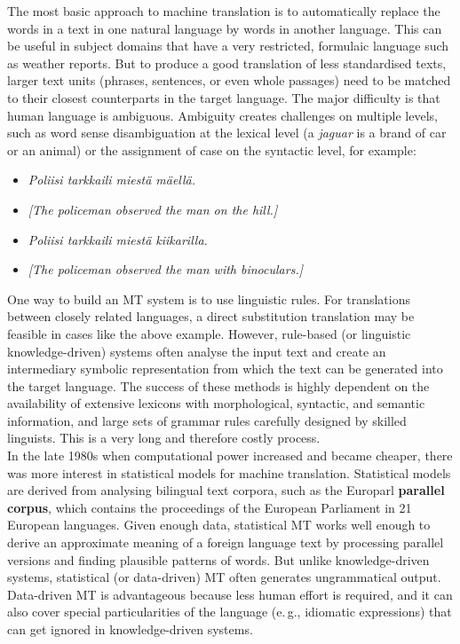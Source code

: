 \begin{multicols}{2}
The most basic approach to machine translation is to automatically replace the
words in a text in one natural language by words in another language. This can
be useful in subject domains that have a very restricted, formulaic language
such as weather reports. But to produce a good translation of less standardised
texts, larger text units (phrases, sentences, or even whole passages) need to
be matched to their closest counterparts in the target language. The major
difficulty is that human language is ambiguous. Ambiguity creates challenges on
multiple levels, such as word sense disambiguation at the lexical level (a
\textit{jaguar} is a brand of car or an animal) or the assignment of case on the
syntactic level, for example:
\begin{itemize}
\item[] {\foreignlanguage{finnish}
         {\textit{Poliisi tarkkaili miestä mäellä.}}} 
\item        \textit{[The policeman observed the man on the hill.]}

\item[] {\foreignlanguage{finnish}{\textit{Poliisi tarkkaili miestä
                kiikarilla.}}} 
\item        \textit{[The policeman observed the man with binoculars.]}
\end{itemize}
One way to build an MT system is to use linguistic rules. For translations
between closely related languages, a direct substitution translation may be
feasible in cases like the above example. However, rule-based (or linguistic
knowledge-driven) systems often analyse the input text and create an
intermediary symbolic representation from which the text can be generated into
the target language. The success of these methods is highly dependent on the
availability of extensive lexicons with morphological, syntactic, and semantic
information, and large sets of grammar rules carefully designed by skilled
linguists. This is a very long and therefore costly process.\\
In the late 1980s when computational power increased and became cheaper, there
was more interest in statistical models for machine translation. Statistical
models are derived from analysing bilingual text corpora, such as the Europarl
\textbf{parallel corpus}, which contains the proceedings of the European Parliament in
21 European languages. Given enough data, statistical MT works well enough to
derive an approximate meaning of a foreign language text by processing parallel
versions and finding plausible patterns of words. But unlike knowledge-driven
systems, statistical (or data-driven) MT often generates ungrammatical output.
Data-driven MT is advantageous because less human effort is required, and it
can also cover special particularities of the language (e.\,g., idiomatic
expressions) that can get ignored in knowledge-driven systems.


\end{multicols}
